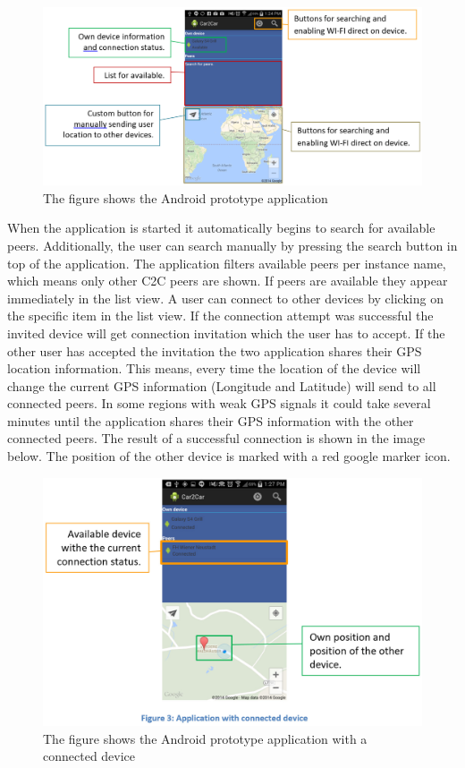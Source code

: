 \begin{figure}[ht]
	\centering
  \includegraphics[width=\linewidth]{images/androidScreen1.eps}
	\caption{The figure shows the Android prototype application}
	\label{fig1}
\end{figure}

\noindent When the application is started it automatically begins to search for available peers. Additionally, the user can search manually by pressing the search button in top of the application. The application filters available peers per instance name, which means only other C2C peers are shown. If peers are available they appear immediately in the list view. A user can connect to other devices by clicking on the specific item in the list view. If the connection attempt was successful the invited device will get connection invitation which the user has to accept.  If the other user has accepted the invitation the two application shares their GPS location information. This means, every time the location of the device will change the current GPS information (Longitude and Latitude) will send to all connected peers. In some regions with weak GPS signals it could take several minutes until the application shares their GPS information with the other connected peers. The result of a successful connection is shown in the image below. The position of the other device is marked with a red google marker icon.


\begin{figure}[!hb]
	\centering
  \includegraphics[width=\linewidth]{images/androidScreen2.eps}
	\caption{The figure shows the Android prototype application with a connected device}
	\label{fig1}
\end{figure}

